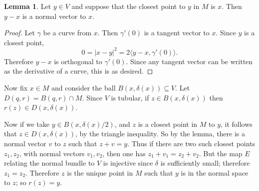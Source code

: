 \documentclass[10pt]{article}
\theoremstyle{definition}
\newtheorem{lemma}{Lemma}[exer]
\begin{document}
\begin{lemma}
Let $y \in V$ and suppose that the closest point to $y$ in $M$ is $x$. Then $y - x$ is a normal vector to $x$.
\end{lemma}
\begin{proof}
Let $\gamma$ be a curve from $x$. Then $\gamma'(0)$ is a tangent vector to $x$.
Since $y$ is a closest point,
$$0 = |x - y|^2 = 2\langle y - x, \gamma'(0)\rangle.$$
Therefore $y - x$ is orthogonal to $\gamma'(0)$.
Since any tangent vector can be written as the derivative of a curve, this is as desired.
\end{proof}

Now fix $x \in M$ and consider the ball $B(x, \delta(x)) \subseteq V$. Let $D(q, r) = B(q, r) \cap M$.
Since $V$ is tubular, if $z \in B(x, \delta(x))$ then $r(z) \in D(x, \delta(x))$.

Now if we take $y \in B(x, \delta(x)/2)$, and $z$ is a closest point in $M$ to $y$, it follows that $z \in D(x, \delta(x))$, by the triangle inequality.
So by the lemma, there is a normal vector $v$ to $z$ such that $z + v = y$.
Thus if there are two such closest points $z_1,z_2$, with normal vectors $v_1,v_2$, then one has $z_1 + v_1 = z_2 + v_2$.
But the map $E$ relating the normal bundle to $V$ is injective since $\delta$ is sufficiently small; therefore $z_1 = z_2$.
Therefore $z$ is the unique point in $M$ such that $y$ is in the normal space to $z$; so $r(z) = y$.
\end{document}
